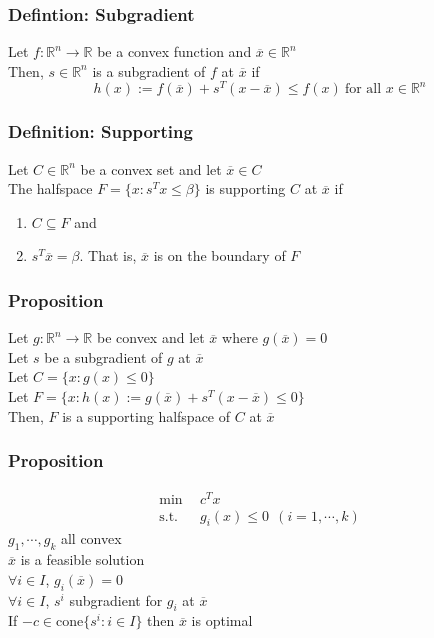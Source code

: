 \documentclass[11pt]{article}
\newcommand{\R}{{\mathbb{R}}}
\begin{document}
\subsubsection{Defintion: Subgradient}
Let $f:\R^n\rightarrow\R$ be a convex function and $\overline{x}\in\R^n$ \\
Then, $s\in\R^n$ is a subgradient of $f$ at $\overline{x}$ if 
\[h(x):= f(\overline{x}) + s^T(x-\overline{x})\leq f(x)\ \text{for all }x\in\R^n\]
\subsubsection{Definition: Supporting}
Let $C\in\R^n$ be a convex set and let $\overline{x}\in C$\\
The halfspace $F=\{x:s^Tx\leq\beta\}$ is supporting $C$ at $\overline{x}$ if 
\begin{enumerate}
  \item $C\subseteq F$ and 
  \item $s^T\overline{x}=\beta$. That is, $\overline{x}$ is on the boundary of $F$
\end{enumerate}
\subsubsection{Proposition}
Let $g:\R^n\rightarrow\R$ be convex and let $\overline{x}$ where $g(\overline{x}) = 0$ \\
Let $s$ be a subgradient of $g$ at $\overline{x}$ \\
Let $C=\{x:g(x)\leq 0\}$ \\
Let $F=\{x:h(x):=g(\overline{x})+s^T(x-\overline{x})\leq0\}$ \\
Then, $F$ is a supporting halfspace of $C$ at $\overline{x}$
\subsubsection{Proposition}
\begin{align*}
  \text{min}\ \ &c^Tx \\
  \text{s.t.}\ \ &g_i(x)\leq 0 \ \ (i=1,\cdots,k)
\end{align*}
$g_1,\cdots, g_k$ all convex \\
$\overline{x}$ is a feasible solution \\
$\forall i\in I$, $g_i(\overline{x}) = 0$ \\
$\forall i\in I$, $s^i$ subgradient for $g_i$ at $\overline{x}$ \\
If $-c\in\text{cone}\{s^i:i\in I\}$ then $\overline{x}$ is optimal 
\end{document}
